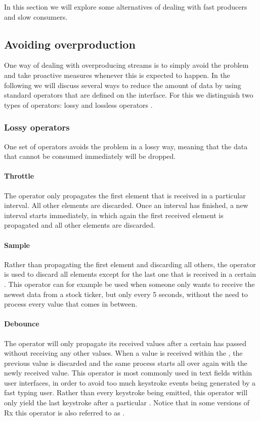In this section we will explore some alternatives of dealing with fast producers and slow consumers.

\subsection{Avoiding overproduction}
\label{subsec:avoiding-overproduction}
One way of dealing with overproducing streams is to simply avoid the problem and take proactive measures whenever this is expected to happen. In the following we will discuss several ways to reduce the amount of data by using standard operators that are defined on the \obs interface. For this we distinguish two types of operators: lossy and lossless operators \cite{Backpressure-Explained}.

\subsubsection{Lossy operators}
One set of operators avoids the problem in a lossy way, meaning that the data that cannot be consumed immediately will be dropped.

\paragraph{Throttle} The  operator only propagates the first element that is received in a particular interval. All other elements are discarded. Once an interval has finished, a new interval starts immediately, in which again the first received element is propagated and all other elements are discarded.

\paragraph{Sample} Rather than propagating the first element and discarding all others, the  operator is used to discard all elements except for the last one that is received in a certain . This operator can for example be used when someone only wants to receive the newest data from a stock ticker, but only every 5 seconds, without the need to process every value that comes in between.

\paragraph{Debounce} The operator  will only propagate its received values after a certain  has passed without receiving any other values. When a value is received within the , the previous value is discarded and the same process starts all over again with the newly received value. This operator is most commonly used in text fields within user interfaces, in order to avoid too much keystroke events being generated by a fast typing user. Rather than every keystroke being emitted, this operator will only yield the last keystroke after a particular . Notice that in some versions of Rx this operator is also referred to as .

